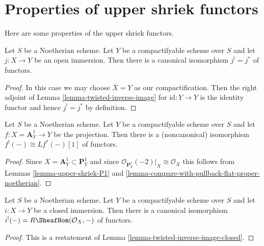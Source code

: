 \section{Properties of upper shriek functors}
\label{section-upper-shriek-properties}

\noindent
Here are some properties of the upper shriek functors.

\begin{lemma}
\label{lemma-shriek-open-immersion}
Let $S$ be a Noetherian scheme. Let $Y$ be a compactifyable
scheme over $S$ and let $j : X \to Y$ be an open immersion.
Then there is a canonical isomorphism $j^! = j^*$ of functors.
\end{lemma}

\begin{proof}
In this case we may choose $\overline{X} = Y$ as our compactification.
Then the
right adjoint of Lemma \ref{lemma-twisted-inverse-image} for
$\text{id} : Y \to Y$ is the
identity functor and hence $j^! = j^*$ by definition.
\end{proof}

\begin{lemma}
\label{lemma-shriek-affine-line}
Let $S$ be a Noetherian scheme. Let $Y$ be a compactifyable
scheme over $S$ and let $f : X = \mathbf{A}^1_Y \to Y$ be
the projection. Then there is a (noncanonical) isomorphism
$f^!(-) \cong Lf^*(-) [1]$ of functors.
\end{lemma}

\begin{proof}
Since $X = \mathbf{A}^1_Y \subset \mathbf{P}^1_Y$
and since $\mathcal{O}_{\mathbf{P}^1_Y}(-2)|_X \cong \mathcal{O}_X$
this follows from Lemmas \ref{lemma-upper-shriek-P1} and
\ref{lemma-compare-with-pullback-flat-proper-noetherian}.
\end{proof}

\begin{lemma}
\label{lemma-shriek-closed-immersion}
Let $S$ be a Noetherian scheme. Let $Y$ be a compactifyable
scheme over $S$ and let $i : X \to Y$ be a closed immersion.
Then there is a canonical isomorphism
$i^!(-) = R\SheafHom(\mathcal{O}_X, -)$ of functors.
\end{lemma}

\begin{proof}
This is a restatement of Lemma \ref{lemma-twisted-inverse-image-closed}.
\end{proof}

